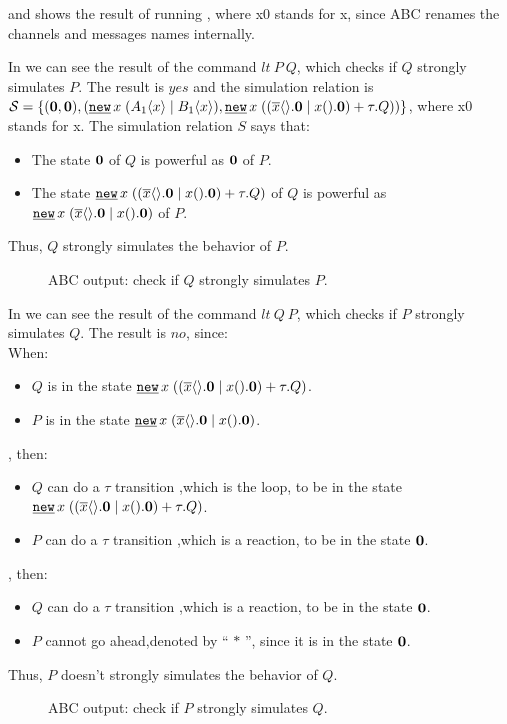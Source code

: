  and  shows the result of running , where x0 stands for x, since ABC renames the channels and messages names internally.

In  we can see the result of the command $lt\ P\ Q$, which checks if $Q$ strongly simulates $P$. The result is $yes$ and the simulation relation is $\mathcal{S} = \set{(\proczero,\proczero),(\procres{x}{(\procpar{\proccall{A_1}{x}}{\proccall{B_1}{x}})},\procres{x}{(\procchoice{(\procpar{\out{x}{}.\proczero}{\inp{x}{}.\proczero})}{\tau.Q})})}$, where x0 stands for x. The simulation relation $S$ says that: 
\begin{itemize}
\item The state $\mathbf{0}$ of $Q$ is powerful as  $\mathbf{0}$ of $P$.
\item The state $\procres{x}{(\procchoice{(\procpar{\out{x}{}.\proczero}{\inp{x}{}.\proczero})}{\tau.Q})}$ of $Q$ is powerful as  $\procres{x}{(\procpar{\out{x}{}.\proczero}{\inp{x}{}.\proczero})}$ of $P$.
\end{itemize}
Thus, $Q$ strongly simulates the behavior of $P$.
\begin{figure}[H]

\caption{ABC output: check if $Q$ strongly simulates $P$.}
\label{pi_simulation_ABC_outputPsQ}
\end{figure}

In  we can see the result of the command $lt\ Q\ P$, which checks if $P$ strongly simulates $Q$. The result is $no$, since:
\\When:
\begin{itemize}
\item $Q$ is in the state $\procres{x}{(\procchoice{(\procpar{\out{x}{}.\proczero}{\inp{x}{}.\proczero})}{\tau.Q})}$.
\item $P$ is in the state $\procres{x}{(\procpar{\out{x}{}.\proczero}{\inp{x}{}.\proczero})}$.
\end{itemize}
, then:
\begin{itemize}
\item $Q$ can do a $\tau$ transition ,which is the loop, to be in the state $\procres{x}{(\procchoice{(\procpar{\out{x}{}.\proczero}{\inp{x}{}.\proczero})}{\tau.Q})}$.
\item $P$ can do a $\tau$ transition ,which is a reaction, to be in the state $\mathbf{0}$.
\end{itemize}
, then:
\begin{itemize}
\item $Q$ can do a $\tau$ transition ,which is a reaction, to be in the state $\mathbf{0}$.
\item $P$ cannot go ahead,denoted by `` $*$ '', since it is in the state $\mathbf{0}$.
\end{itemize}

Thus, $P$ doesn't strongly simulates the behavior of $Q$.
\begin{figure}[ht!]

\caption{ABC output: check if $P$ strongly simulates $Q$.}
\label{pi_simulation_ABC_outputQsP}
\end{figure}
